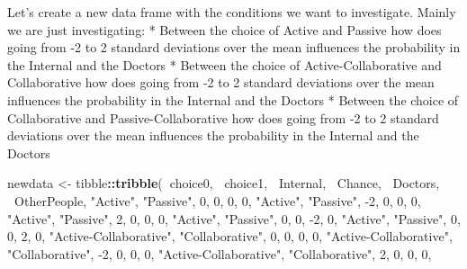 \documentclass[
]{book}
\newenvironment{Shaded}{\begin{snugshade}}{\end{snugshade}}
\newcommand{\DecValTok}[1]{\textcolor[rgb]{0.00,0.00,0.81}{#1}}
\newcommand{\KeywordTok}[1]{\textcolor[rgb]{0.13,0.29,0.53}{\textbf{#1}}}
\newcommand{\NormalTok}[1]{#1}
\newcommand{\OperatorTok}[1]{\textcolor[rgb]{0.81,0.36,0.00}{\textbf{#1}}}
\newcommand{\StringTok}[1]{\textcolor[rgb]{0.31,0.60,0.02}{#1}}
\begin{document}
Let's create a new data frame with the conditions we want to investigate.
Mainly we are just investigating:
* Between the choice of Active and Passive how does going from -2 to 2 standard deviations over the mean influences the probability in the Internal and the Doctors
* Between the choice of Active-Collaborative and Collaborative how does going from -2 to 2 standard deviations over the mean influences the probability in the Internal and the Doctors
* Between the choice of Collaborative and Passive-Collaborative how does going from -2 to 2 standard deviations over the mean influences the probability in the Internal and the Doctors

\begin{Shaded}
\begin{Highlighting}[]
\NormalTok{newdata <-}\StringTok{ }\NormalTok{tibble}\OperatorTok{::}\KeywordTok{tribble}\NormalTok{(}\OperatorTok{~}\NormalTok{choice0, }\OperatorTok{~}\NormalTok{choice1, }\OperatorTok{~}\NormalTok{Internal, }\OperatorTok{~}\NormalTok{Chance, }\OperatorTok{~}\NormalTok{Doctors, }\OperatorTok{~}\NormalTok{OtherPeople,}
                           \StringTok{"Active"}\NormalTok{, }\StringTok{"Passive"}\NormalTok{, }\DecValTok{0}\NormalTok{, }\DecValTok{0}\NormalTok{, }\DecValTok{0}\NormalTok{, }\DecValTok{0}\NormalTok{,}
                           \StringTok{"Active"}\NormalTok{, }\StringTok{"Passive"}\NormalTok{, }\DecValTok{-2}\NormalTok{, }\DecValTok{0}\NormalTok{, }\DecValTok{0}\NormalTok{, }\DecValTok{0}\NormalTok{,}
                           \StringTok{"Active"}\NormalTok{, }\StringTok{"Passive"}\NormalTok{, }\DecValTok{2}\NormalTok{, }\DecValTok{0}\NormalTok{, }\DecValTok{0}\NormalTok{, }\DecValTok{0}\NormalTok{,}
                           \StringTok{"Active"}\NormalTok{, }\StringTok{"Passive"}\NormalTok{, }\DecValTok{0}\NormalTok{, }\DecValTok{0}\NormalTok{, }\DecValTok{-2}\NormalTok{, }\DecValTok{0}\NormalTok{,}
                           \StringTok{"Active"}\NormalTok{, }\StringTok{"Passive"}\NormalTok{, }\DecValTok{0}\NormalTok{, }\DecValTok{0}\NormalTok{, }\DecValTok{2}\NormalTok{, }\DecValTok{0}\NormalTok{,}
                           \StringTok{"Active-Collaborative"}\NormalTok{, }\StringTok{"Collaborative"}\NormalTok{, }\DecValTok{0}\NormalTok{, }\DecValTok{0}\NormalTok{, }\DecValTok{0}\NormalTok{, }\DecValTok{0}\NormalTok{,}
                           \StringTok{"Active-Collaborative"}\NormalTok{, }\StringTok{"Collaborative"}\NormalTok{, }\DecValTok{-2}\NormalTok{, }\DecValTok{0}\NormalTok{, }\DecValTok{0}\NormalTok{, }\DecValTok{0}\NormalTok{,}
                           \StringTok{"Active-Collaborative"}\NormalTok{, }\StringTok{"Collaborative"}\NormalTok{, }\DecValTok{2}\NormalTok{, }\DecValTok{0}\NormalTok{, }\DecValTok{0}\NormalTok{, }\DecValTok{0}\NormalTok{,}

\end{Highlighting}
\end{Shaded}
\end{document}
